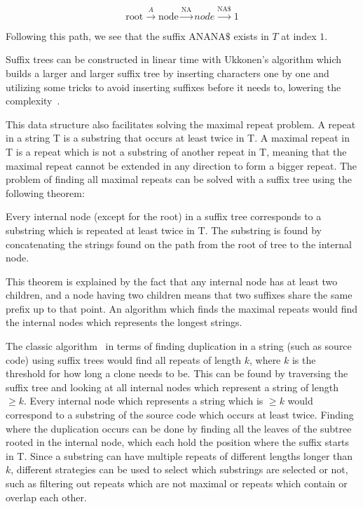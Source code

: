 $$
\text{root} \xrightarrow{A} \text{node} \xrightarrow{\text{NA}} node \xrightarrow{\text{NA\$}} 1
$$

Following this path, we see that the suffix $\text{ANANA\$}$ exists in $T$ at index $1$.

Suffix trees can be constructed in linear time with Ukkonen's algorithm which builds a
larger and larger suffix tree by inserting characters one by one and utilizing some tricks
to avoid inserting suffixes before it needs to, lowering the complexity~\cite{Ukkonen}.

This data structure also facilitates solving the maximal repeat problem. A repeat in a
string T is a substring that occurs at least twice in T. A maximal repeat in T is a repeat
which is not a substring of another repeat in T, meaning that the maximal repeat cannot be
extended in any direction to form a bigger repeat. The problem of finding all maximal
repeats can be solved with a suffix tree using the following theorem:

\begin{theorem}

    Every internal node (except for the root) in a suffix tree corresponds to a substring
    which is repeated at least twice in T. The substring is found by concatenating the
    strings found on the path from the root of tree to the internal node.

\end{theorem}

This theorem is explained by the fact that any internal node has at least two children, and a
node having two children means that two suffixes share the same prefix up to that point.
An algorithm which finds the maximal repeats would find the internal nodes which
represents the longest strings. 

The classic algorithm~\cite{Zibran_real_time_search, GodeIncrementalCloneDetection} in
terms of finding duplication in a string (such as source code) using suffix trees would
find all repeats of length $k$, where $k$ is the threshold for how long a clone needs to
be. This can be found by traversing the suffix tree and looking at all internal nodes
which represent a string of length $\geq k$. Every internal node which represents a string
which is $\geq k$ would correspond to a substring of the source code which occurs at least
twice. Finding where the duplication occurs can be done by finding all the leaves of the
subtree rooted in the internal node, which each hold the position where the suffix starts in
T. Since a substring can have multiple repeats of different lengths longer than $k$,
different strategies can be used to select which substrings are selected or not, such as
filtering out repeats which are not maximal or repeats which contain or overlap each other.

